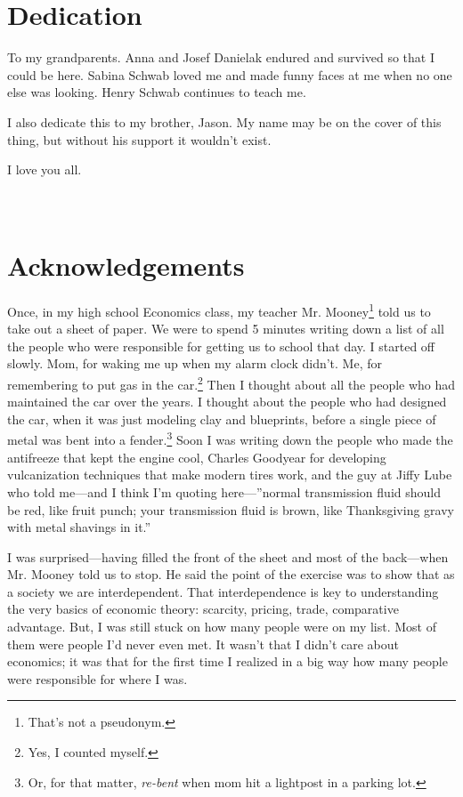 \section{Dedication}\label{dedication}

To my grandparents. Anna and Josef Danielak endured and survived so that
I could be here. Sabina Schwab loved me and made funny faces at me when
no one else was looking. Henry Schwab continues to teach me.

I also dedicate this to my brother, Jason. My name may be on the cover
of this thing, but without his support it wouldn't exist.

I love you all.

\section{\texorpdfstring{\\
Acknowledgements}{ Acknowledgements}}\label{acknowledgements}

Once, in my high school Economics class, my teacher Mr. Mooney\footnote{That's
  not a pseudonym.} told us to take out a sheet of paper. We were to
spend 5 minutes writing down a list of all the people who were
responsible for getting us to school that day. I started off slowly.
Mom, for waking me up when my alarm clock didn't. Me, for remembering to
put gas in the car.\footnote{Yes, I counted myself.} Then I thought
about all the people who had maintained the car over the years. I
thought about the people who had designed the car, when it was just
modeling clay and blueprints, before a single piece of metal was bent
into a fender.\footnote{Or, for that matter, \emph{re-bent} when mom hit
  a lightpost in a parking lot.} Soon I was writing down the people who
made the antifreeze that kept the engine cool, Charles Goodyear for
developing vulcanization techniques that make modern tires work, and the
guy at Jiffy Lube who told me---and I think I'm quoting here---''normal
transmission fluid should be red, like fruit punch; your transmission
fluid is brown, like Thanksgiving gravy with metal shavings in it.''

I was surprised---having filled the front of the sheet and most of the
back---when Mr. Mooney told us to stop. He said the point of the
exercise was to show that as a society we are interdependent. That
interdependence is key to understanding the very basics of economic
theory: scarcity, pricing, trade, comparative advantage. But, I was
still stuck on how many people were on my list. Most of them were people
I'd never even met. It wasn't that I didn't care about economics; it was
that for the first time I realized in a big way how many people were
responsible for where I was.

